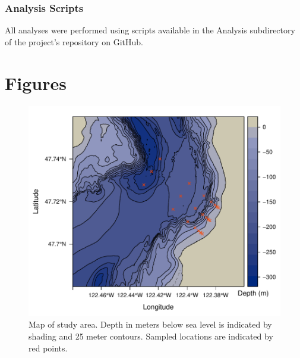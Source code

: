 \documentclass[11pt,letterpaper]{article} %
\begin{document}
\subsubsection*{Analysis Scripts}
\label{analysis_scripts}
All analyses were performed using scripts available in the Analysis subdirectory of the project's repository on GitHub.




\pagebreak
\section*{Figures}

\begin{figure}[H] %
  \centering
    \includegraphics[width=1\textwidth]{site_map.pdf}
    \caption{
		Map of study area.
		Depth in meters below sea level is indicated by shading and 25 meter contours. Sampled locations are indicated by red points.
		}
  \label{site_map}
\end{figure}
\end{document}
